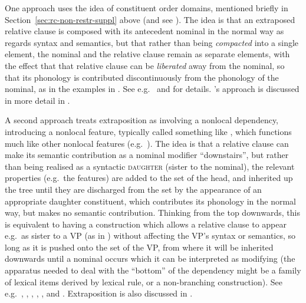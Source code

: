 \documentclass[output=paper
 	        ,biblatex
                ,babelshorthands
                ,newtxmath
                ,draftmode
                ,colorlinks, citecolor=brown
]{langscibook}
\begin{document}
One approach uses the idea of constituent order domains, mentioned briefly in
Section~\ref{sec:rc-non-restr-suppl} above (and see ). The idea is
that an extraposed relative clause is composed with its antecedent nominal in the normal way as regards syntax and semantics, but that rather
than being \emph{compacted} into a single  element, the nominal and the
relative clause remain as separate  elements, with the effect that that
relative clause can be \emph{liberated} away from the nominal, so that its phonology is
contributed discontinuously from the phonology of the nominal, as in the examples in
.  See e.g.\  and 
for details. \citeauthor{Kathol:Pollard:95}'s approach is discussed in more detail in .

A second approach treats extraposition as involving a nonlocal dependency, introducing a
nonlocal feature, typically called something like , which functions much
like other nonlocal features (e.g.\ ).  The idea is that a relative
clause can make its semantic contribution as a nominal modifier ``downstairs'', but rather
than being realised as a syntactic \textsc{daughter} (sister to the nominal), the relevant
properties (e.g.\ the  features) are added to the  set of the
head, and inherited up the tree until they are discharged from the  set by
the appearance of an appropriate daughter constituent, which contributes its
phonology in the normal way, but makes no semantic contribution. Thinking from the top
downwards, this is equivalent to having a construction which allows a relative clause to
appear e.g.\ as sister to a VP (as in ) without affecting the VP's syntax or
semantics, so long as it is pushed onto the  set of the VP, from where it
will be inherited downwards until a nominal occurs which it can be interpreted as modifying (the
apparatus needed to deal with the ``bottom'' of the dependency might be a family of lexical
items derived by lexical rule, or a non-branching construction). See e.g.\
, ,  , , ,
and \citew{Crysmann2013a}. Extraposition is also discussed in .
\end{document}
